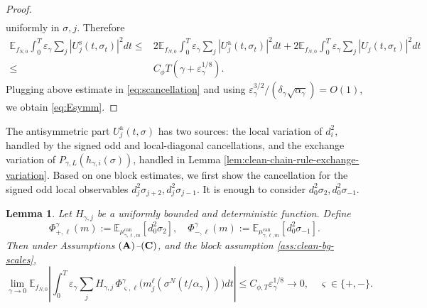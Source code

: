 \documentclass{article}
\newtheorem{lemma}{Lemma}
\begin{document}
\begin{proof}
\begin{align}
\end{align}
uniformly in $\sigma, j$. Therefore
\begin{align}
    \mathbb E_{f_{N,0}}\int_0^T \varepsilon_\gamma\sum_j |U_j^{\mathrm s}(t,\sigma_t)|^2dt \le & 2\mathbb E_{f_{N,0}}\int_0^T \varepsilon_\gamma\sum_j |U_j^{\mathrm a}(t,\sigma_t)|^2dt + 2\mathbb E_{f_{N,0}}\int_0^T \varepsilon_\gamma\sum_j |U_j(t,\sigma_t)|^2dt \nonumber \\
    \le & C_\phi T (\gamma + \varepsilon^{1/8}_{\gamma}).
\end{align}
Plugging above estimate in \eqref{eq:scancellation} and using
\(\varepsilon_\gamma^{3/2}/(\delta_\gamma\sqrt{\alpha_\gamma})=O(1)\), we obtain \eqref{eq:Esymm}.
\end{proof}

The antisymmetric part $U_j^{\mathrm a}(t,\sigma) $ has two sources: the local variation of \(d_i^2\), handled by the signed odd and local-diagonal cancellations, and the exchange variation
of \( P_{\gamma,L}(h_{\gamma,i}(\sigma))\), handled in Lemma \ref{lem:clean-chain-rule-exchange-variation}.
Based on one block estimates, we first show the cancellation for the signed odd local observables $d_j^2\sigma_{j+2}, d_j^2\sigma_{j-1}$. It is enough to consider $d_0^2\sigma_2, d_0^2\sigma_{-1}$.

\begin{lemma}\label{lem:clean-signed-odd}
Let \(H_{\gamma,j}\) be a uniformly bounded and deterministic function.
Define
\[
\Phi_{+,\ell}^{\gamma}(m)
:=
\mathbb E_{\mu_{\gamma,\ell,m}^{\mathrm{can}}}[d_0^2\sigma_2],
\quad
\Phi_{-,\ell}^{\gamma}(m) := \mathbb E_{\mu_{\gamma,\ell,m}^{\mathrm{can}}}[d_0^2\sigma_{-1}].
\]
Then under Assumptions \(({\bf A})\)--\(({\bf C})\), and the block assumption \eqref{ass:clean-bg-scales},
\[
\lim_{\gamma \to 0}\mathbb E_{f_{N,0}}
\left|\int_0^T \varepsilon_\gamma\sum_j
H_{\gamma,j}\,\Phi_{\varsigma,\ell}^{\gamma}
\bigl(m_j^\ell(\sigma^N(t/\alpha_\gamma))\bigr)dt \right| \le C_{\phi,T}\varepsilon^{1/8}_{\gamma}  \to 0, \quad \varsigma\in\{+,-\}.
\]
\end{lemma}
\end{document}
